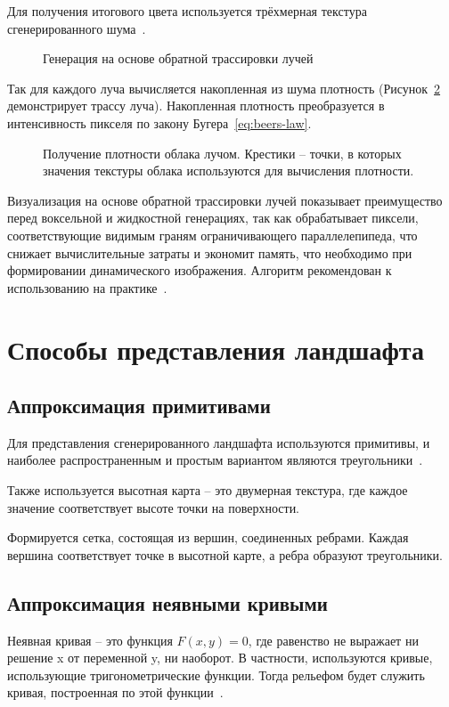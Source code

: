 Для получения итогового цвета используется трёхмерная текстура сгенерированного шума~\cite{guerrilla_volumetric_cloudscapes_2023}.
\newpage
\begin{figure}[htb!]
	\centering
	   
	\caption{Генерация на основе обратной трассировки лучей}
	\label{fig:my_label}
\end{figure}

Так для каждого луча вычисляется накопленная из шума плотность (Рисунок~\ref{fig:cloud-sampling} демонстрирует трассу луча). Накопленная плотность преобразуется в интенсивность пикселя по закону Бугера~\ref{eq:beers-law}.
\begin{figure}[htb!]
	\centering
	   
	\caption{Получение плотности облака лучом. Крестики -- точки, в которых значения текстуры облака используются для вычисления плотности.}
	\label{fig:cloud-sampling}
\end{figure}


Визуализация на основе обратной трассировки лучей показывает преимущество перед воксельной и жидкостной генерациях, так как обрабатывает пиксели, соответствующие видимым граням ограничивающего параллелепипеда, что снижает вычислительные затраты и экономит память, что необходимо при формировании динамического изображения.
Алгоритм рекомендован к использованию на практике~\cite{guerrilla_volumetric_cloudscapes_2023, sym10040125, windahl_real_time_2018}.

\section{Способы представления ландшафта}
\subsection{Аппроксимация примитивами}
Для представления сгенерированного ландшафта используются примитивы, и наиболее распространенным и простым вариантом являются треугольники~\cite{hirnschall_perlin_2024}.

Также используется высотная карта -- это двумерная текстура, где каждое значение соответствует высоте точки на поверхности. 

Формируется сетка, состоящая из вершин, соединенных ребрами. Каждая вершина соответствует точке в высотной карте, а ребра образуют треугольники.

\subsection{Аппроксимация неявными кривыми}
Неявная кривая -- это функция $F(x, y) = 0$, где равенство не выражает ни решение x от переменной y, ни наоборот.
В частности, используются кривые, использующие тригонометрические функции.
Тогда рельефом будет служить кривая, построенная по этой функции~\cite{bird2013techniques}.


